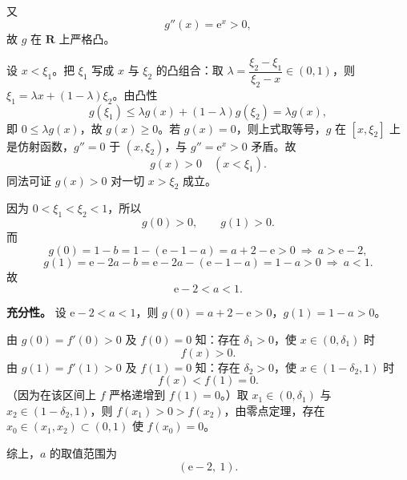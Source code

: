 \begin{answer}
又
\nopagebreak[4]
\[g''(x)=\mathrm e^x>0,\]
故 $g$ 在 $\mathbf R$ 上严格凸。

设 $x<\xi_1$。把 $\xi_1$ 写成 $x$ 与 $\xi_2$ 的凸组合：取 $\lambda=\dfrac{\xi_2-\xi_1}{\xi_2-x}\in(0,1)$，则 $\xi_1=\lambda x+(1-\lambda)\xi_2$。由凸性
\nopagebreak[4]
\[g(\xi_1)\leqslant\lambda g(x)+(1-\lambda)g(\xi_2)=\lambda g(x),\]
即 $0\leqslant\lambda g(x)$，故 $g(x)\geqslant 0$。若 $g(x)=0$，则上式取等号，$g$ 在 $[x,\xi_2]$ 上是仿射函数，$g''=0$ 于 $(x,\xi_2)$，与 $g''=\mathrm e^x>0$ 矛盾。故
\nopagebreak[4]
\[g(x)>0\quad(x<\xi_1).\]
同法可证 $g(x)>0$ 对一切 $x>\xi_2$ 成立。

因为 $0<\xi_1<\xi_2<1$，所以
\nopagebreak[4]
\[g(0)>0,\qquad g(1)>0 .\]
而
\nopagebreak[4]
\[g(0)=1-b=1-(\mathrm e-1-a)=a+2-\mathrm e>0\ \Longrightarrow\ a>\mathrm e-2,\]
\nopagebreak[4]
\[g(1)=\mathrm e-2a-b=\mathrm e-2a-(\mathrm e-1-a)=1-a>0\ \Longrightarrow\ a<1 .\]
故
\nopagebreak[4]
\[\mathrm e-2<a<1 .\]

\textbf{充分性。} 设 $\mathrm e-2<a<1$，则 $g(0)=a+2-\mathrm e>0$，$g(1)=1-a>0$。

由 $g(0)=f'(0)>0$ 及 $f(0)=0$ 知：存在 $\delta_1>0$，使 $x\in(0,\delta_1)$ 时
\nopagebreak[4]
\[f(x)>0 .\]
由 $g(1)=f'(1)>0$ 及 $f(1)=0$ 知：存在 $\delta_2>0$，使 $x\in(1-\delta_2,1)$ 时
\nopagebreak[4]
\[f(x)<f(1)=0 .\]
（因为在该区间上 $f$ 严格递增到 $f(1)=0$。）取 $x_1\in(0,\delta_1)$ 与 $x_2\in(1-\delta_2,1)$，则 $f(x_1)>0>f(x_2)$，由零点定理，存在 $x_0\in(x_1,x_2)\subset(0,1)$ 使 $f(x_0)=0$。

综上，$a$ 的取值范围为
\nopagebreak[4]
\[(\mathrm e-2,\ 1).\]



\end{answer}